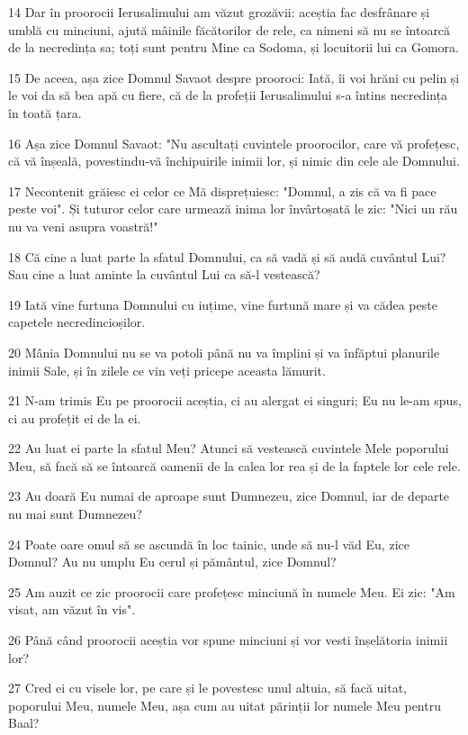 \par 14 Dar în proorocii Ierusalimului am văzut grozăvii: aceștia fac desfrânare și umblă cu minciuni, ajută mâinile făcătorilor de rele, ca nimeni să nu se întoarcă de la necredința sa; toți sunt pentru Mine ca Sodoma, și locuitorii lui ca Gomora.
\par 15 De aceea, așa zice Domnul Savaot despre prooroci: Iată, îi voi hrăni cu pelin și le voi da să bea apă cu fiere, că de la profeții Ierusalimului s-a întins necredința în toată țara.
\par 16 Așa zice Domnul Savaot: "Nu ascultați cuvintele proorocilor, care vă profețesc, că vă înșeală, povestindu-vă închipuirile inimii lor, și nimic din cele ale Domnului.
\par 17 Necontenit grăiesc ei celor ce Mă disprețuiesc: "Domnul, a zis că va fi pace peste voi". Și tuturor celor care urmează inima lor învârtoșată le zic: "Nici un rău nu va veni asupra voastră!"
\par 18 Că cine a luat parte la sfatul Domnului, ca să vadă și să audă cuvântul Lui? Sau cine a luat aminte la cuvântul Lui ca să-l vestească?
\par 19 Iată vine furtuna Domnului cu iuțime, vine furtună mare și va cădea peste capetele necredincioșilor.
\par 20 Mânia Domnului nu se va potoli până nu va împlini și va înfăptui planurile inimii Sale, și în zilele ce vin veți pricepe aceasta lămurit.
\par 21 N-am trimis Eu pe proorocii aceștia, ci au alergat ei singuri; Eu nu le-am spus, ci au profețit ei de la ei.
\par 22 Au luat ei parte la sfatul Meu? Atunci să vestească cuvintele Mele poporului Meu, să facă să se întoarcă oamenii de la calea lor rea și de la faptele lor cele rele.
\par 23 Au doară Eu numai de aproape sunt Dumnezeu, zice Domnul, iar de departe nu mai sunt Dumnezeu?
\par 24 Poate oare omul să se ascundă în loc tainic, unde să nu-l văd Eu, zice Domnul? Au nu umplu Eu cerul și pământul, zice Domnul?
\par 25 Am auzit ce zic proorocii care profețesc minciună în numele Meu. Ei zic: "Am visat, am văzut în vis".
\par 26 Până când proorocii aceștia vor spune minciuni și vor vesti înșelătoria inimii lor?
\par 27 Cred ei cu visele lor, pe care și le povestesc unul altuia, să facă uitat, poporului Meu, numele Meu, așa cum au uitat părinții lor numele Meu pentru Baal?
